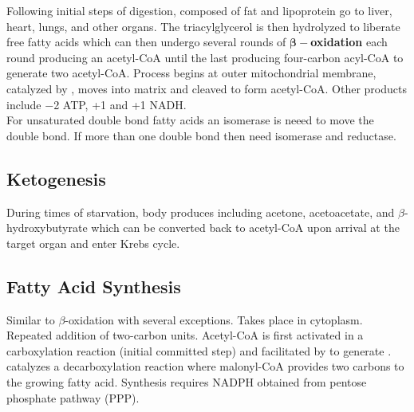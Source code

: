 \documentclass[../Bio_chemistryReview.tex]{subfiles}
\begin{document}
Following initial steps of digestion,  composed of fat and
lipoprotein go to liver, heart, lungs, and other organs. The triacylglycerol is
then hydrolyzed to liberate free fatty acids which can then undergo several
rounds of $ \boldsymbol{\beta}- $\textbf{oxidation} each round producing an
acetyl-CoA until the last producing four-carbon acyl-CoA to generate two
acetyl-CoA. Process begins at outer mitochondrial membrane, catalyzed by
, moves into matrix and cleaved to form acetyl-CoA.
Other products include $ - $2 ATP, +1  and +1 NADH. \\
For unsaturated double bond fatty acids an isomerase is neeed to move the double
bond. If more than one double bond then need isomerase and reductase.

\subsection{Ketogenesis}

During times of starvation, body produces  including
acetone, acetoacetate, and $ \beta $-hydroxybutyrate which can be converted back
to acetyl-CoA upon arrival at the target organ and enter Krebs cycle. 

\subsection{Fatty Acid Synthesis}

Similar to $ \beta $-oxidation with several exceptions. Takes place in
cytoplasm. Repeated addition of two-carbon units. Acetyl-CoA is first activated
in a carboxylation reaction (initial committed step) and facilitated by
 to generate .\\
 catalyzes a decarboxylation reaction where
malonyl-CoA provides two carbons to the growing fatty acid. Synthesis requires
NADPH obtained from pentose phosphate pathway (PPP).  
\end{document}

